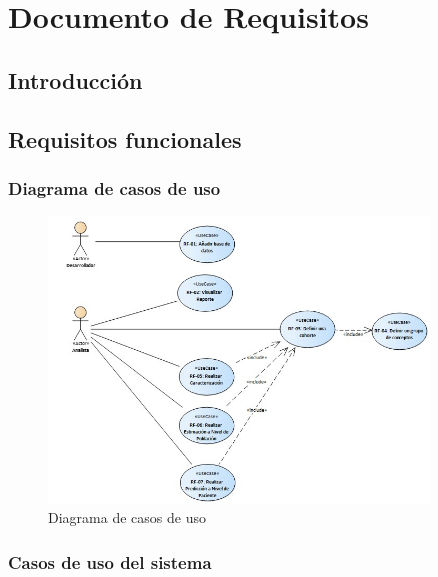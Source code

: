 \chapter{Documento de Requisitos}\label{cap:06requisitos}

\section{Introducción}






\section{Requisitos funcionales}

\subsection{Diagrama de casos de uso} \label{subsec:06FRdiagrama}

\begin{figure}[H]
    \centering
    \includegraphics[width=0.90\textwidth]{figures/FRdiagram.jpg}
    \caption{Diagrama de casos de uso}
    \label{fig:FRdiagram}
\end{figure}

\subsection{Casos de uso del sistema}

